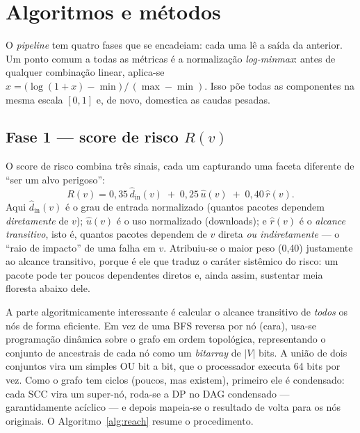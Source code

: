 \documentclass[11pt,a4paper]{article}
\begin{document}
\section{Algoritmos e métodos}\label{sec:metodos}

O \emph{pipeline} tem quatro fases que se encadeiam: cada uma lê a saída da anterior.
Um ponto comum a todas as métricas é a normalização \emph{log-minmax}: antes de
qualquer combinação linear, aplica-se $\hat{x} = \big(\log(1+x) - \min\big)\,/\,
(\max-\min)$. Isso põe todas as componentes na mesma escala $[0,1]$ e, de novo,
domestica as caudas pesadas.

\subsection{Fase 1 --- score de risco $R(v)$}\label{sec:fase1}

O score de risco combina três sinais, cada um capturando uma faceta diferente de
``ser um alvo perigoso'':
\[
  R(v) = 0{,}35\,\hat{d}_{\text{in}}(v) \;+\; 0{,}25\,\hat{u}(v) \;+\; 0{,}40\,\hat{r}(v).
\]
Aqui $\hat{d}_{\text{in}}(v)$ é o grau de entrada normalizado (quantos pacotes
dependem \emph{diretamente} de $v$); $\hat{u}(v)$ é o uso normalizado (downloads); e
$\hat{r}(v)$ é o \emph{alcance transitivo}, isto é, quantos pacotes dependem de $v$
direta \emph{ou indiretamente} --- o ``raio de impacto'' de uma falha em $v$. Atribuiu-se o
maior peso (0,40) justamente ao alcance transitivo, porque é ele que traduz o
caráter sistêmico do risco: um pacote pode ter poucos dependentes diretos e, ainda
assim, sustentar meia floresta abaixo dele.

A parte algoritmicamente interessante é calcular o alcance transitivo de
\emph{todos} os nós de forma eficiente. Em vez de uma BFS reversa por nó (cara), usa-se
programação dinâmica sobre o grafo em ordem topológica, representando o conjunto de
ancestrais de cada nó como um \emph{bitarray} de $|V|$ bits. A união de dois conjuntos
vira um simples OU bit a bit, que o processador executa 64 bits por vez. Como o grafo
tem ciclos (poucos, mas existem), primeiro ele é condensado: cada SCC vira um
super-nó, roda-se a DP no DAG condensado --- garantidamente acíclico --- e depois
mapeia-se o resultado de volta para os nós originais. O Algoritmo~\ref{alg:reach}
resume o procedimento.
\end{document}
